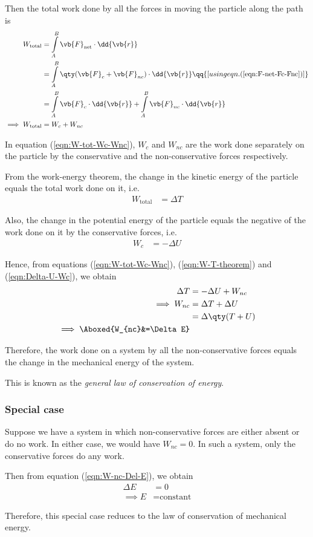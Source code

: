 		Then the total work done by all the forces in moving the particle along the path is
		\begin{align}
			W_\text{total}&=\int\limits_{A}^{B}{\vb{F}_\text{net}\cdot\dd{\vb{r}}} \nonumber\\
				&=\int\limits_{A}^{B}{\qty(\vb{F}_c+\vb{F}_{nc})\cdot\dd{\vb{r}}}\qq{[using eqn. (\ref{eqn:F-net-Fc-Fnc})]} \nonumber\\
				&=\int\limits_{A}^{B}{\vb{F}_c\cdot\dd{\vb{r}}} + \int\limits_{A}^{B}{\vb{F}_{nc}\cdot\dd{\vb{r}}} \nonumber\\
			\implies W_\text{total}&=W_c+W_{nc} \label{eqn:W-tot-Wc-Wnc}
		\end{align}
		
		In equation (\ref{eqn:W-tot-Wc-Wnc}), $W_c$ and $W_{nc}$ are the work done separately on the particle by the conservative and the non-conservative forces respectively.
		
		From the work-energy theorem, the change in the kinetic energy of the particle equals the total work done on it, i.e.
		\begin{align}
			W_\text{total}&=\Delta T \label{eqn:W-T-theorem}
		\end{align}
		
		Also, the change in the potential energy of the particle equals the negative of the work done on it by the conservative forces, i.e.
		\begin{align}
			W_c&=-\Delta U \label{eqn:Delta-U-Wc}
		\end{align}
		
		Hence, from equations (\ref{eqn:W-tot-Wc-Wnc}), (\ref{eqn:W-T-theorem}) and (\ref{eqn:Delta-U-Wc}), we obtain
		\begin{align}
			\Delta T&=-\Delta U+W_{nc} \nonumber\\
			\implies W_{nc}&=\Delta T + \Delta U \nonumber\\
				&=\Delta\qty(T+U) \nonumber\\
			\implies\Aboxed{W_{nc}&=\Delta E} \label{eqn:W-nc-Del-E}
		\end{align}
		
		Therefore, the work done on a system by all the non-conservative forces equals the change in the mechanical energy of the system.
		
		This is known as the \emph{general law of conservation of energy}.
		
		\subsubsection*{Special case}
			Suppose we have a system in which non-conservative forces are either absent or do no work. In either case, we would have $W_{nc}=0$. In such a system, only the conservative forces do any work.
			
			Then from equation (\ref{eqn:W-nc-Del-E}), we obtain
			\begin{align*}
				\Delta E&=0 \\
				\implies E&=\text{constant}
			\end{align*}
			
			Therefore, this special case reduces to the law of conservation of mechanical energy.